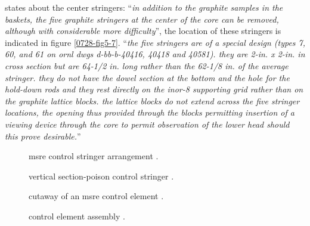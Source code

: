 \documentclass{article}
\begin{document}
\begin{preview}
\parencite[page 84]{ornl-tm-0728} states about the center stringers:
\enquote{\textit{in addition to the graphite samples in the baskets, the five graphite stringers at the center of the core can be removed, although with considerable more difficulty}}, the location of these stringers is indicated in figure \ref{0728-fig5-7}.
\enquote{\textit{the five stringers are of a special design (types 7, 60, and 61 on ornl dwgs d-bb-b-40416, 40418 and 40581). they are 2-in. x 2-in. in cross section but are 64-1/2 in. long rather than the 62-1/8 in. of the average stringer. they do not have the dowel section at the bottom and the hole for the hold-down rods and they rest directly on the inor-8 supporting grid rather than on the graphite lattice blocks. the lattice blocks do not extend across the five stringer locations, the opening thus provided through the blocks permitting insertion of a viewing device through the core to permit observation of the lower head should this prove desirable.}}


\begin{figure}[H]
  \centering
  \caption{msre control stringer arrangement \parencite[figure 14a]{ad-cf-61-2-46}.}
  \label{61246-fig14a}
\end{figure}

\begin{figure}[H]
  \centering
  \caption{vertical section-poison control stringer \parencite[figure 14b]{ad-cf-61-2-46}.}
  \label{61246-fig14b}
\end{figure}

\begin{figure}[H]
  \centering
  \caption{cutaway of an msre control element \parencite[figure 1]{ornl-4123}.}
  \label{4123-fig1}
\end{figure}

\begin{figure}[H]
  \centering
  \caption{control element assembly \parencite[figure B-1 to B-4]{ornl-4123}.}
  \label{4123-fig1}
\end{figure}


\end{preview}
\end{document}
